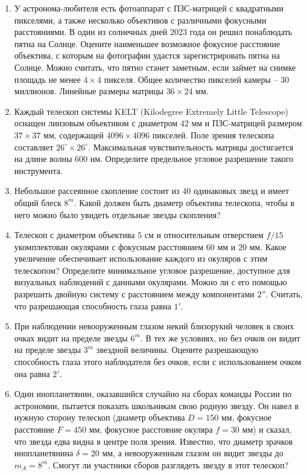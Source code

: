 \documentclass[12pt]{article}
\begin{document}
\begin{enumerate}
    \item У астронома-любителя есть фотоаппарат с ПЗС-матрицей с квадратными пикселями, а также несколько объективов с различными фокусными расстояниями. В один из солнечных дней $2023$ года он решил понаблюдать пятна на Солнце. Оцените наименьшее возможное фокусное расстояние объектива, с которым на фотографии удастся зарегистрировать пятна на Солнце. Можно считать, что пятно станет заметным, если займет на снимке площадь не менее $4\times4$ пикселя. Общее количество пикселей камеры -- $30$ миллионов. Линейные размеры матрицы $36\times24$ мм.
    \item Каждый телескоп системы KELT (Kilodegree Extremely Little Telescope) оснащен линзовым объективом с диаметром $42$ мм и ПЗС-матрицей размером $37\times37$ мм, содержащей $4096\times4096$ пикселей. Поле зрения телескопа составляет $26^{\circ}\times26^{\circ}$. Максимальная чувствительность матрицы достигается на длине волны $600$ нм. Определите предельное угловое разрешение такого инструмента.
    \item Небольшое рассеянное скопление состоит из $40$ одинаковых звезд и имеет общий блеск $8^m$. Какой должен быть диаметр объектива телескопа, чтобы в него можно было увидеть отдельные звезды скопления? 
    \item Телескоп с диаметром объектива $5$ см и относительным отверстием $f/15$ укомплектован окулярами с фокусным расстоянием $60$ мм и $20$ мм. Какое увеличение обеспечивает использование каждого из окуляров с этим телескопом? Определите минимальное угловое разрешение, доступное для визуальных наблюдений с данными окулярами. Можно ли с его помощью разрешить двойную систему с расстоянием между компонентами $2''$. Считать, что разрешающая способность глаза равна $1'$. 
    \item При наблюдении невооруженным глазом некий близорукий человек в своих очках видит на пределе звезды $6^m$. В тех же условиях, но без очков он видит на пределе звезды $3^m$ звездной величины. Оцените разрешающую способность глаза этого наблюдателя без очков, если с использованием очком она равна $2'$.
    \item Один инопланетянин, оказавшийся случайно на сборах команды России по астрономии, пытается показать школьникам свою родную звезду. Он навел в нужную сторону телескоп (диаметр объектива $D = 150$ мм, фокусное расстояние $F = 450$ мм, фокусное расстояние окуляра $f = 30$ мм) и сказал, что звезда едва видна в центре поля зрения. Известно, что диаметр зрачков инопланетянина $\delta = 20$ мм, а невооруженным глазом он видит звезды до $m_A = 8^m$. Смогут ли участники сборов разглядеть звезду в этот телескоп?

\end{enumerate}
\end{document}
